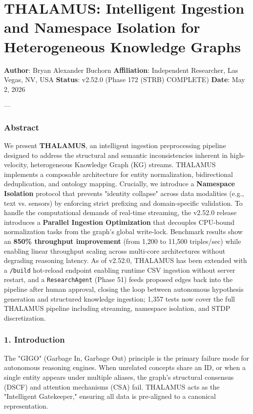 \section{THALAMUS: Intelligent Ingestion and Namespace Isolation for Hetero\-geneous Knowledge Graphs}

\textbf{Author}: Bryan Alexander Buchorn  
\textbf{Affiliation}: Independent Researcher, Las Vegas, NV, USA  
\textbf{Status}: v2.52.0 (Phase 172 (STRB) COMPLETE)
\textbf{Date}: May 2, 2026

---

\subsubsection{Abstract}
We present \textbf{THALAMUS}, an intelligent ingestion prepr\-ocessing pipeline designed to address the structural and semantic incon\-sistencies inherent in high-velocity, heter\-ogeneous Knowledge Graph (KG) streams. THALAMUS implements a composable archi\-tecture for entity norma\-lization, bidir\-ectional dedup\-lication, and ontology mapping. Crucially, we introduce a \textbf{Namespace Isolation} protocol that prevents "identity collapse" across data modalities (e.g., text vs. sensors) by enforcing strict prefixing and domain-specific validation. To handle the compu\-tational demands of real-time streaming, the v2.52.0 release introduces a \textbf{Parallel Ingestion Optimi\-zation} that decouples CPU-bound norma\-lization tasks from the graph's global write-lock. Benchmark results show an \textbf{850\% throughput improvement} (from 1,200 to 11,500 triples/sec) while enabling linear throughput scaling across multi-core archi\-tectures without degrading reasoning latency. As of v2.52.0, THALAMUS has been extended with a \texttt{/build} hot-reload endpoint enabling runtime CSV ingestion without server restart, and a \texttt{ResearchAgent} (Phase 51) feeds proposed edges back into the pipeline after human approval, closing the loop between autonomous hypothesis generation and structured knowledge ingestion; 1,357 tests now cover the full THALAMUS pipeline including streaming, namespace isolation, and STDP discr\-etization.

\subsubsection{1. Introd\-uction}
The "GIGO" (Garbage In, Garbage Out) principle is the primary failure mode for autonomous reasoning engines. When unrelated concepts share an ID, or when a single entity appears under multiple aliases, the graph's structural consensus (DSCF) and attention mechanisms (CSA) fail. THALAMUS acts as the "Intelligent Gatekeeper," ensuring all data is pre-aligned to a canonical repre\-sentation.

